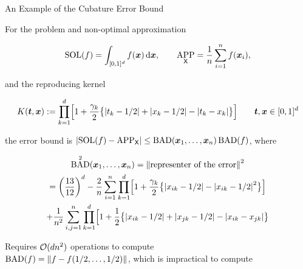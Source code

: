 \documentclass[10pt,compress,xcolor={usenames,dvipsnames},aspectratio=169]{beamer}
\DeclareMathOperator{\SOL}{SOL}
\DeclareMathOperator{\APP}{APP}
\DeclareMathOperator{\BAD}{BAD}
\begin{document}
\begin{frame}{An Example of the Cubature Error Bound \cite{Hic97a}}
	
	\vspace{-4ex}
	For the problem and non-optimal approximation
	
	\vspace{-4ex}
	\[
	\SOL(f) = \int_{[0,1]^d} f(\vx) \, \dif \vx, \qquad \APP_{\mX} = \frac 1n \sum_{i=1}^n f(\vx_i),
	\]
	
	\vspace{-3ex}
	and the reproducing kernel
	
	\vspace{-4ex}
	\[
	K(\boldsymbol{t},\boldsymbol{x}) : = \prod_{k=1}^d \Bigl[ 1 + \frac {\gamma_k}2 \bigl\{ \left \lvert t_k - 1/2 \right \rvert + \left \lvert x_k -1/2 \right \rvert - \left \lvert t_k-x_k \right \rvert \bigr\} \Bigr] \qquad \boldsymbol{t}, \boldsymbol{x} \in [0,1]^d
	\]
	
	\vspace{-3ex}
	 the error bound is $\abs{\SOL(f) -  \APP_{\mX}} \le \BAD(\vx_1, \ldots, \vx_n) \BAD(f)$, where 
	 
	 \vspace{-4ex}
		\begin{multline*}
			\BAD^2(\vx_1, \ldots, \vx_n) = \norm{\text{representer of the error}}^2 \\
			= \left(\frac{13}{12}\right)^d - \frac 2n \sum_{i=1}^n \prod_{k=1}^d \Bigl[ 1 + \frac {\gamma_k}2 \bigl\{ \abs{x_{ik} - 1/2} - \abs{x_{ik}-1/2}^2 \bigr\} \Bigr] \\
			+ \frac 1{n^2} \sum_{i,j=1}^n\prod_{k=1}^d \Bigl[ 1 + \frac 12 \bigl\{ \abs{x_{ik} - 1/2} + \abs{x_{jk} -1/2} - \abs{x_{ik}-x_{jk}} \bigr\}
		\end{multline*}
	
	\vspace{-4ex}
		Requires $\operatorname{{\mathcal O}}(dn^2)$ operations to compute \\ $\BAD(f) =  \norm{f - f(1/2, \ldots, 1/2)}$, which is impractical to compute
\end{frame}
\end{document}
